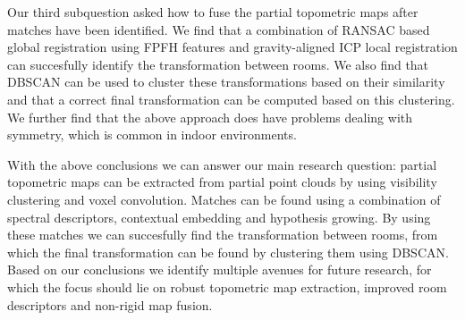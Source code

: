 Our third subquestion asked how to fuse the partial topometric maps after matches have been identified. We find that a combination of RANSAC based global registration using FPFH features and gravity-aligned ICP local registration can succesfully identify the transformation between rooms. We also find that DBSCAN can be used to cluster these transformations based on their similarity and that a correct final transformation can be computed based on this clustering. We further find that the above approach does have problems dealing with symmetry, which is common in indoor environments.

With the above conclusions we can answer our main research question: partial topometric maps can be extracted from partial point clouds by using visibility clustering and voxel convolution. Matches can be found using a combination of spectral descriptors, contextual embedding and hypothesis growing. By using these matches we can succesfully find the transformation between rooms, from which the final transformation can be found by clustering them using DBSCAN. Based on our conclusions we identify multiple avenues for future research, for which the focus should lie on robust topometric map extraction, improved room descriptors and non-rigid map fusion.